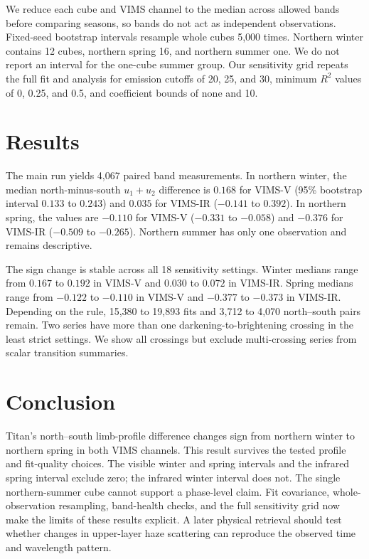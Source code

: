 \documentclass[tighten,linenumbers,twocolumn]{aastex631}
\begin{document}
We reduce each cube and VIMS channel to the median across allowed bands before comparing seasons, so bands do not act as independent observations. Fixed-seed bootstrap intervals resample whole cubes 5,000 times. Northern winter contains 12 cubes, northern spring 16, and northern summer one. We do not report an interval for the one-cube summer group. Our sensitivity grid repeats the full fit and analysis for emission cutoffs of 20\textdegree{}, 25\textdegree{}, and 30\textdegree{}, minimum $R^2$ values of 0, 0.25, and 0.5, and coefficient bounds of none and 10.
\section{Results}\label{section:results}

The main run yields 4,067 paired band measurements. In northern winter, the median north-minus-south $u_1+u_2$ difference is $0.168$ for VIMS-V (95\% bootstrap interval $0.133$ to $0.243$) and $0.035$ for VIMS-IR ($-0.141$ to $0.392$). In northern spring, the values are $-0.110$ for VIMS-V ($-0.331$ to $-0.058$) and $-0.376$ for VIMS-IR ($-0.509$ to $-0.265$). Northern summer has only one observation and remains descriptive.

The sign change is stable across all 18 sensitivity settings. Winter medians range from $0.167$ to $0.192$ in VIMS-V and $0.030$ to $0.072$ in VIMS-IR. Spring medians range from $-0.122$ to $-0.110$ in VIMS-V and $-0.377$ to $-0.373$ in VIMS-IR. Depending on the rule, 15,380 to 19,893 fits and 3,712 to 4,070 north--south pairs remain. Two series have more than one darkening-to-brightening crossing in the least strict settings. We show all crossings but exclude multi-crossing series from scalar transition summaries.

\section{Conclusion}\label{section:conclusion}

Titan's north--south limb-profile difference changes sign from northern winter to northern spring in both VIMS channels. This result survives the tested profile and fit-quality choices. The visible winter and spring intervals and the infrared spring interval exclude zero; the infrared winter interval does not. The single northern-summer cube cannot support a phase-level claim. Fit covariance, whole-observation resampling, band-health checks, and the full sensitivity grid now make the limits of these results explicit. A later physical retrieval should test whether changes in upper-layer haze scattering can reproduce the observed time and wavelength pattern.
\end{document}
